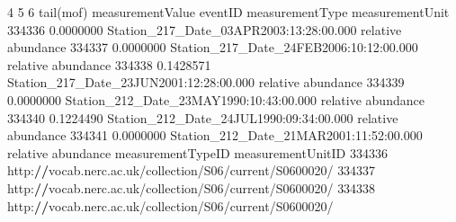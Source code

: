 \documentclass[
]{book}
\newenvironment{Shaded}{\begin{snugshade}}{\end{snugshade}}
\newcommand{\DecValTok}[1]{\textcolor[rgb]{0.00,0.00,0.81}{#1}}
\newcommand{\ErrorTok}[1]{\textcolor[rgb]{0.64,0.00,0.00}{\textbf{#1}}}
\newcommand{\FloatTok}[1]{\textcolor[rgb]{0.00,0.00,0.81}{#1}}
\newcommand{\FunctionTok}[1]{\textcolor[rgb]{0.00,0.00,0.00}{#1}}
\newcommand{\NormalTok}[1]{#1}
\newcommand{\SpecialCharTok}[1]{\textcolor[rgb]{0.00,0.00,0.00}{#1}}
\begin{document}
\begin{Shaded}
\begin{Highlighting}[]
\DecValTok{4}                               
\DecValTok{5}                               
\DecValTok{6}                               
\FunctionTok{tail}\NormalTok{(mof)}
\NormalTok{       measurementValue                                 eventID    measurementType measurementUnit}
\DecValTok{334336}        \FloatTok{0.0000000}\NormalTok{ Station\_217\_Date\_03APR2003}\SpecialCharTok{:}\DecValTok{13}\SpecialCharTok{:}\DecValTok{28}\SpecialCharTok{:}\FloatTok{00.000}\NormalTok{ relative abundance                }
\DecValTok{334337}        \FloatTok{0.0000000}\NormalTok{ Station\_217\_Date\_24FEB2006}\SpecialCharTok{:}\DecValTok{10}\SpecialCharTok{:}\DecValTok{12}\SpecialCharTok{:}\FloatTok{00.000}\NormalTok{ relative abundance                }
\DecValTok{334338}        \FloatTok{0.1428571}\NormalTok{ Station\_217\_Date\_23JUN2001}\SpecialCharTok{:}\DecValTok{12}\SpecialCharTok{:}\DecValTok{28}\SpecialCharTok{:}\FloatTok{00.000}\NormalTok{ relative abundance                }
\DecValTok{334339}        \FloatTok{0.0000000}\NormalTok{ Station\_212\_Date\_23MAY1990}\SpecialCharTok{:}\DecValTok{10}\SpecialCharTok{:}\DecValTok{43}\SpecialCharTok{:}\FloatTok{00.000}\NormalTok{ relative abundance                }
\DecValTok{334340}        \FloatTok{0.1224490}\NormalTok{ Station\_212\_Date\_24JUL1990}\SpecialCharTok{:}\DecValTok{09}\SpecialCharTok{:}\DecValTok{34}\SpecialCharTok{:}\FloatTok{00.000}\NormalTok{ relative abundance                }
\DecValTok{334341}        \FloatTok{0.0000000}\NormalTok{ Station\_212\_Date\_21MAR2001}\SpecialCharTok{:}\DecValTok{11}\SpecialCharTok{:}\DecValTok{52}\SpecialCharTok{:}\FloatTok{00.000}\NormalTok{ relative abundance                }
\NormalTok{                                              measurementTypeID measurementUnitID}
\DecValTok{334336}\NormalTok{ http}\SpecialCharTok{:}\ErrorTok{//}\NormalTok{vocab.nerc.ac.uk}\SpecialCharTok{/}\NormalTok{collection}\SpecialCharTok{/}\NormalTok{S06}\SpecialCharTok{/}\NormalTok{current}\SpecialCharTok{/}\NormalTok{S0600020}\SpecialCharTok{/}                  
\DecValTok{334337}\NormalTok{ http}\SpecialCharTok{:}\ErrorTok{//}\NormalTok{vocab.nerc.ac.uk}\SpecialCharTok{/}\NormalTok{collection}\SpecialCharTok{/}\NormalTok{S06}\SpecialCharTok{/}\NormalTok{current}\SpecialCharTok{/}\NormalTok{S0600020}\SpecialCharTok{/}                  
\DecValTok{334338}\NormalTok{ http}\SpecialCharTok{:}\ErrorTok{//}\NormalTok{vocab.nerc.ac.uk}\SpecialCharTok{/}\NormalTok{collection}\SpecialCharTok{/}\NormalTok{S06}\SpecialCharTok{/}\NormalTok{current}\SpecialCharTok{/}\NormalTok{S0600020}\SpecialCharTok{/}                  

\end{Highlighting}
\end{Shaded}
\end{document}
